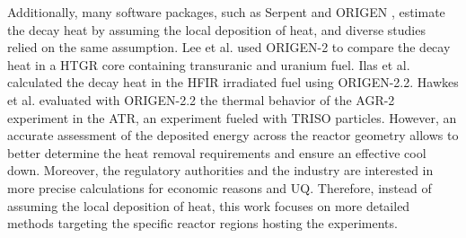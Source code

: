 Additionally, many software packages, such as Serpent \cite{giot_decay_2018} and ORIGEN \cite{scale}, estimate the decay heat by assuming the local deposition of heat, and diverse studies relied on the same assumption.
Lee et al. \cite{lee_decay_2010} used ORIGEN-2 to compare the decay heat in a \gls*{HTGR} core containing transuranic and uranium fuel.
Ilas et al. \cite{ilas_modeling_2015} calculated the decay heat in the HFIR irradiated fuel using ORIGEN-2.2.
Hawkes et al. \cite{hawkes_sensitivity_2015} evaluated with ORIGEN-2.2 the thermal behavior of the AGR-2 experiment in the ATR, an experiment fueled with \gls*{TRISO} particles.
However, an accurate assessment of the deposited energy across the reactor geometry allows to better determine the heat removal requirements and ensure an effective cool down.
Moreover, the regulatory authorities and the industry are interested in more precise calculations for economic reasons and \gls*{UQ}.
Therefore, instead of assuming the local deposition of heat, this work focuses on more detailed methods targeting the specific reactor regions hosting the experiments.

